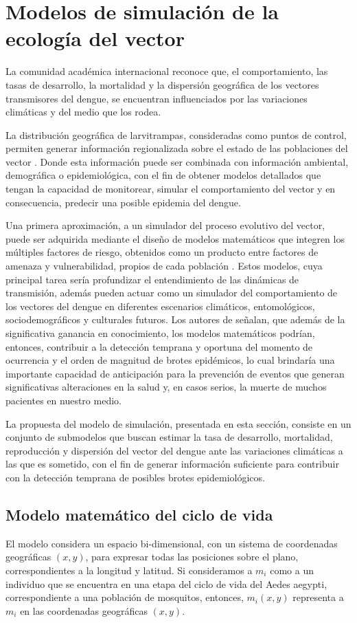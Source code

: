 \section{Modelos de simulación de la ecología del vector}
\label{sec:cap4-modelo-simulacion}
La comunidad académica internacional reconoce que, el comportamiento, las tasas de desarrollo, la
mortalidad y la dispersión geográfica de los vectores transmisores del dengue, se encuentran
influenciados por las variaciones climáticas y del medio que los rodea.

La distribución geográfica de larvitrampas, consideradas como puntos de control, permiten generar
información regionalizada sobre el estado de las poblaciones del vector \cite{NINO2011}. Donde esta
información puede ser combinada con información ambiental, demográfica o epidemiológica, con el
fin de obtener modelos detallados que tengan la capacidad de monitorear, simular el comportamiento
del vector y en consecuencia, predecir una posible epidemia del dengue.

Una primera aproximación, a un simulador del proceso evolutivo del vector, puede ser adquirida
mediante el diseño de modelos matemáticos que integren los múltiples factores de riesgo, obtenidos
como un producto entre factores de amenaza y vulnerabilidad, propios de cada población
\cite{velez2013hacia}. Estos modelos, cuya principal tarea sería profundizar el entendimiento de
las dinámicas de transmisión, además pueden actuar como un simulador del comportamiento de los
vectores del dengue en diferentes escenarios climáticos, entomológicos, sociodemográficos y
culturales futuros. Los autores de \cite{velez2013hacia} señalan, que además de la significativa
ganancia en conocimiento, los modelos matemáticos podrían, entonces, contribuir a la detección
temprana y oportuna del momento de ocurrencia y el orden de magnitud de brotes epidémicos, lo cual
brindaría una importante capacidad de anticipación para la prevención de eventos que generan
significativas alteraciones en la salud y, en casos serios, la muerte de muchos pacientes en
nuestro medio.

La propuesta del modelo de simulación, presentada en esta sección, consiste en un conjunto de
submodelos que buscan estimar la tasa de desarrollo, mortalidad, reproducción y dispersión del
vector del dengue ante las variaciones climáticas a las que es sometido, con el fin de generar
información suficiente para contribuir con la detección temprana de posibles brotes
epidemiológicos.

\subsection{Modelo matemático del ciclo de vida}
\label{subsec:cap4-modelo-matematico-ciclo-vida}
El modelo considera un espacio bi-dimensional, con un sistema de coordenadas geográficas $(x,y)$,
para expresar todas las posiciones sobre el plano, correspondientes a la longitud y latitud. Si
consideramos a $m_{i}$ como a un individuo que se encuentra en una etapa del ciclo de vida del
Aedes aegypti, correspondiente a una población de mosquitos, entonces, $m_{i}(x,y)$ representa a
$m_{i}$ en las coordenadas geográficas $(x,y)$.


